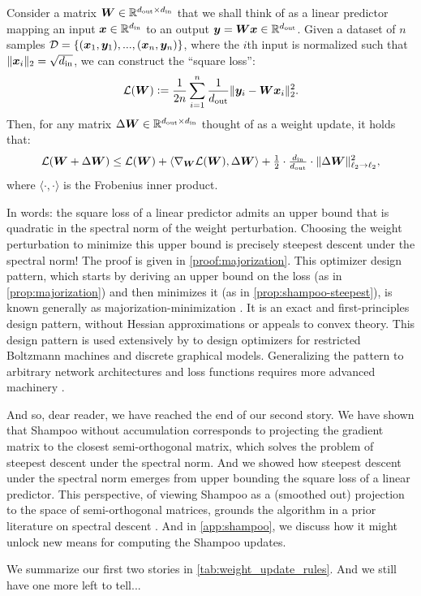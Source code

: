 \begin{myproposition}\label{prop:majorization} Consider a matrix ${\bm{W}} \in \mathbb{R}^{d_\mathrm{out}\times d _\mathrm{in}}$ that we shall think of as a linear predictor mapping an input ${\bm{x}} \in \mathbb{R}^{d_\mathrm{in}}$ to an output ${\bm{y}} = {\bm{W}} {\bm{x}} \in \mathbb{R}^{d_\mathrm{out}}$. Given a dataset of $n$ samples $\mathcal{D} = \{({\bm{x}}_1,{\bm{y}}_1), ..., ({\bm{x}}_n,{\bm{y}}_n)\}$, where the $i$th input is normalized such that $\|{\bm{x}}_i\|_2 = \sqrt{d_{\mathrm{in}}}$, we can construct the ``square loss'':
\begin{equation}
    \mathcal{L}({\bm{W}}) \vcentcolon= \frac{1}{2n}\sum_{i=1}^n \frac{1}{d_{\mathrm{out}}}\Vert {{\bm{y}}_i - {\bm{W}}{\bm{x}}_i} \Vert_2^2.
\end{equation}
Then, for any matrix $\Delta{\bm{W}} \in \mathbb{R}^{d_\mathrm{out}\times d _\mathrm{in}}$ thought of as a weight update, it holds that:
\begin{equation}\label{eq:square-majorization}
    \mathcal{L}({\bm{W}} + \Delta {\bm{W}}) \leq \mathcal{L}({\bm{W}}) + \langle\nabla_{\bm{W}} \mathcal{L}({\bm{W}}), \Delta {\bm{W}}\rangle + \tfrac{1}{2} \cdot \tfrac{d_{\mathrm{in}}}{d_{\mathrm{out}}}\cdot\Vert {\Delta {\bm{W}}} \Vert_\mathrm{\ell_2\to\ell_2}^2,
\end{equation}
where $\langle\cdot,\cdot\rangle$ is the Frobenius inner product.
\end{myproposition}
In words: the square loss of a linear predictor admits an upper bound that is quadratic in the spectral norm of the weight perturbation. Choosing the weight perturbation to minimize this upper bound is precisely steepest descent under the spectral norm! The proof is given in \cref{proof:majorization}. This optimizer design pattern, which starts by deriving an upper bound on the loss (as in \cref{prop:majorization}) and then minimizes it (as in \cref{prop:shampoo-steepest}), is known generally as majorization-minimization \citep{mm}. It is an exact and first-principles design pattern, without Hessian approximations or appeals to convex theory. This design pattern is used extensively by \citet{spectral-descent-2, spectral-descent-1} to design optimizers for restricted Boltzmann machines and discrete graphical models. Generalizing the pattern to arbitrary network architectures and loss functions requires more advanced machinery \citep{agd-2023,streeter2023universal,modula}.


\ornament

And so, dear reader, we have reached the end of our second story. We have shown that Shampoo without accumulation corresponds to projecting the gradient matrix to the closest semi-orthogonal matrix, which solves the problem of steepest descent under the spectral norm. And we showed how steepest descent under the spectral norm emerges from upper bounding the square loss of a linear predictor. This perspective, of viewing Shampoo as a (smoothed out) projection to the space of semi-orthogonal matrices, grounds the algorithm in a prior literature on spectral descent \citep{spectral-descent-2,spectral-descent-1,spectral-descent-3}. And in \cref{app:shampoo}, we discuss how it might unlock new means for computing the Shampoo updates.

We summarize our first two stories in \cref{tab:weight_update_rules}. And we still have one more left to tell...
